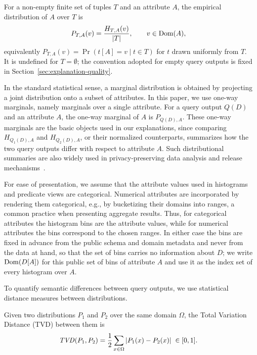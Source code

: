 \begin{definition}
\label{def:empirical-distribution}
For a non-empty finite set of tuples $T$ and an attribute $A$, the empirical
distribution of $A$ over $T$ is
\[
P_{T,A}(v) = \frac{H_{T,A}(v)}{|T|},
\qquad v\in\operatorname{Dom}(A),
\]
equivalently $P_{T,A}(v)=\Pr\left(t[A]=v \mid t\in T\right)$ for $t$ drawn uniformly
from $T$. It is undefined for $T=\emptyset$; the convention adopted for empty query
outputs is fixed in Section~\ref{sec:explanation-quality}.
\end{definition}

In the standard statistical sense, a marginal distribution is obtained by
projecting a joint distribution onto a subset of attributes. In this
paper, we use one-way marginals, namely marginals over a single
attribute.
For a query output $Q(D)$ and an attribute $A$, the one-way marginal of
$A$ is $P_{Q(D),A}$.
These one-way marginals are the basic objects used in our explanations, since
comparing $H_{Q_1(D),A}$ and $H_{Q_2(D),A}$, or their normalized counterparts,
summarizes how the two query outputs differ with respect to attribute $A$.
Such distributional summaries are also widely used in privacy-preserving data
analysis and release mechanisms~\cite{TheAlgFoundDP2014}.

For ease of presentation, we assume that the attribute values used in
histograms and predicate views are categorical. Numerical attributes are
incorporated by rendering them categorical, e.g., by bucketizing their
domains into ranges, a common practice when presenting aggregate
results. Thus, for categorical attributes the histogram bins are the
attribute values, while for numerical attributes the bins correspond to
the chosen ranges.
In either case the bins are fixed in advance from the public schema and domain
metadata and never from the data at hand, so that the set of bins carries no
information about $D$; we write $\operatorname{Dom}(D[A])$ for this public set of bins of
attribute $A$ and use it as the index set of every histogram over $A$.



To quantify semantic differences between query outputs, we use statistical distance
measures between distributions.

\begin{definition}
\label{def:tvd}
Given two distributions $P_1$ and $P_2$ over the same domain $\Omega$, the Total
Variation Distance (TVD) between them is
\[
\mathit{TVD}(P_1,P_2)
=
\frac{1}{2}
\sum_{x\in\Omega}
|P_1(x)-P_2(x)| \; \in [0,1].
\]
\end{definition}


